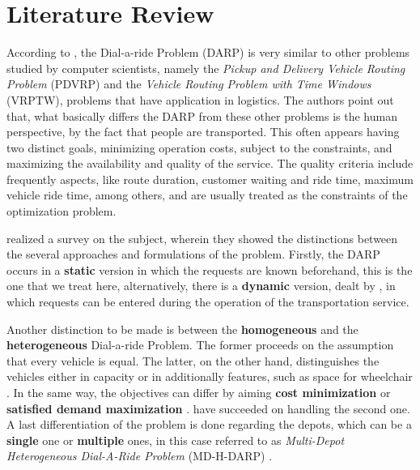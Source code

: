 \documentclass[tuberlin,cic,tc,openright,english,noabntcite,oneside]{iiufrgs}
\begin{document}
\chapter{Literature Review}
According to \textcite[p. 30]{cordeau_dial--ride_2007}, the Dial-a-ride Problem (DARP) is very similar to other problems studied by computer scientists, namely the \emph{Pickup and Delivery Vehicle Routing Problem} (PDVRP) and the \emph{Vehicle Routing Problem with Time Windows} (VRPTW), problems that have application in logistics. The authors point out that, what basically differs the DARP from these other problems is the human perspective, by the fact that people are transported. This often appears having two distinct goals, minimizing operation costs, subject to the constraints, and maximizing the availability and quality of the service. The quality criteria include frequently aspects, like route duration, customer waiting and ride time, maximum vehicle ride time, among others, and are usually treated as the constraints of the optimization problem.

\textcite{cordeau_dial--ride_2007} realized a survey on the subject, wherein they showed the distinctions between the several approaches and formulations of the problem. Firstly, the DARP occurs in a \textbf{static} version in which the requests are known beforehand, this is the one that we treat here, alternatively, there is a \textbf{dynamic} version, dealt by \textcite{berbeglia_dynamic_2010}, in which requests can be entered during the operation of the transportation service.

Another distinction to be made is between the \textbf{homogeneous} and the \textbf{heterogeneous} Dial-a-ride Problem. The former proceeds on the assumption that every vehicle is equal. The latter, on the other hand, distinguishes the vehicles either in capacity or in additionally features, such as space for wheelchair  \parencite[p. 593]{parragh_models_2012}. In the same way, the objectives can differ by aiming \textbf{cost minimization} or \textbf{satisfied demand maximization} \parencite[p. 30]{cordeau_dial--ride_2007}. \textcite{urra_hyperheuristic_2015} have succeeded on handling the second one. A last differentiation of the problem is done regarding the depots, which can be a \textbf{single} one or \textbf{multiple} ones, in this case referred to as \emph{Multi-Depot Heterogeneous Dial-A-Ride Problem} (MD-H-DARP) \parencite[p. 166]{braekers_exact_2014}.
\end{document}
